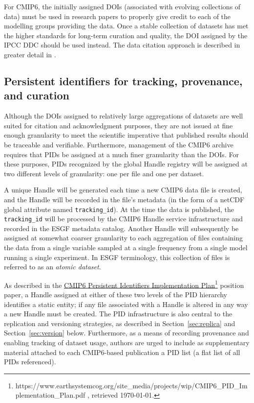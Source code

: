 \documentclass[gmd,manuscript]{copernicus}
\begin{document}
For CMIP6, the initially assigned DOIs (associated with evolving
collections of data) must be used in research papers to properly give
credit to each of the modelling groups providing the data. Once a
stable collection of datasets has met the higher standards for
long-term curation and quality, the DOI assigned by the IPCC DDC
should be used instead. The data citation approach is described in
greater detail in \cite{ref:stockhauselautenschlager2017}.

\subsection{Persistent identifiers for tracking, provenance, and
  curation}
\label{sec:pid}

Although the DOIs assigned to relatively large aggregations of
datasets are well suited for citation and acknowledgment purposes,
they are not issued at fine enough granularity to meet the scientific
imperative that published results should be traceable and verifiable.
Furthermore, management of the CMIP6 archive requires that PIDs be
assigned at a much finer granularity than the DOIs. For these
purposes, PIDs recognized by the global Handle registry will be
assigned at two different levels of granularity: one per file and one
per dataset.

A unique Handle will be generated each time a new CMIP6 data file is
created, and the Handle will be recorded in the file's metadata (in
the form of a netCDF global attribute named \texttt{tracking\_id}). At
the time the data is published, the \texttt{tracking\_id} will be
processed by the CMIP6 Handle service infrastructure and recorded in
the ESGF metadata catalog. Another Handle will subsequently be
assigned at somewhat coarser granularity to each aggregation of files
containing the data from a single variable sampled at a single
frequency from a single model running a single experiment. In ESGF
terminology, this collection of files is referred to as an
\emph{atomic dataset}.

As described in the
\href{https://www.earthsystemcog.org/site_media/projects/wip/CMIP6_PID_Implementation_Plan.pdf
}{CMIP6 Persistent Identifiers Implementation
  Plan}\footnote{https://www.earthsystemcog.org/site\_media/projects/wip/CMIP6\_PID\_Implementation\_Plan.pdf
  , retrieved \today.} position paper, a Handle assigned at either of
these two levels of the PID hierarchy identifies a static entity; if
any file associated with a Handle is altered in any way a new Handle
must be created. The PID infrastructure is also central to the
replication and versioning strategies, as described in
Section~\ref{sec:replica} and Section~\ref{sec:version} below.
Furthermore, as a means of recording provenance and enabling tracking
of dataset usage, authors are urged to include as supplementary
material attached to each CMIP6-based publication a PID list (a flat
list of all PIDs referenced).
\end{document}
